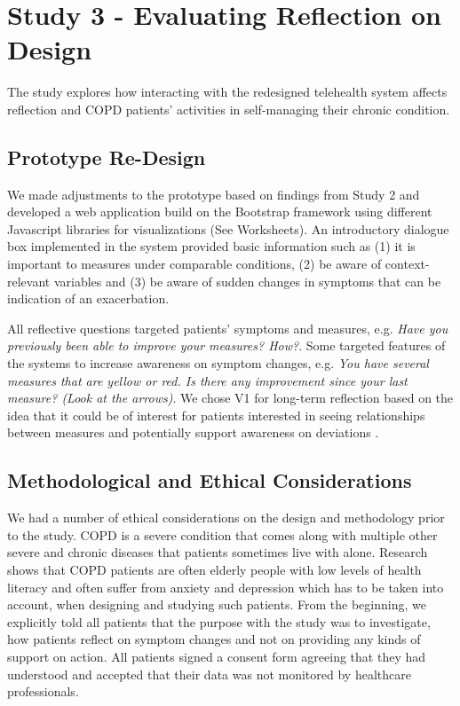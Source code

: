 \section{Study 3 - Evaluating Reflection on Design} 

The study explores how interacting with the redesigned telehealth system affects reflection and COPD patients’ activities in self-managing their chronic condition. 

\subsection{Prototype Re-Design}
We made adjustments to the prototype based on findings from Study 2 and developed a web application build on the Bootstrap framework using different Javascript libraries for visualizations (See Worksheets). An introductory dialogue box implemented in the system provided basic information such as (1) it is important to measures under comparable conditions, (2) be aware of context-relevant variables and (3) be aware of sudden changes in symptoms that can be indication of an exacerbation. 

All reflective questions targeted patients’ symptoms and measures, e.g. \textit{Have you previously been able to improve your measures? How?}. Some targeted features of the systems to increase awareness on symptom changes, e.g. \textit{You have several measures that are yellow or red. Is there any improvement since your last measure? (Look at the arrows)}. We chose V1 for long-term reflection based on the idea that it could be of interest for patients interested in seeing relationships between measures and potentially support awareness on deviations \cite{Rivera, Cuttone}. 

\subsection{Methodological and Ethical Considerations}
We had a number of ethical considerations on the design and methodology prior to the study. COPD is a severe condition that comes along with multiple other severe and chronic diseases that patients sometimes live with alone. Research shows that COPD patients are often elderly people with low levels of health literacy \cite{Lisa} and often suffer from anxiety and depression \cite{Who} which has to be taken into account, when designing and studying such patients. From the beginning, we explicitly told all patients that the purpose with the study was to investigate, how patients reflect on symptom changes and not on providing any kinds of support on action. All patients signed a consent form agreeing that they had understood and accepted that their data was not monitored by healthcare professionals. 

